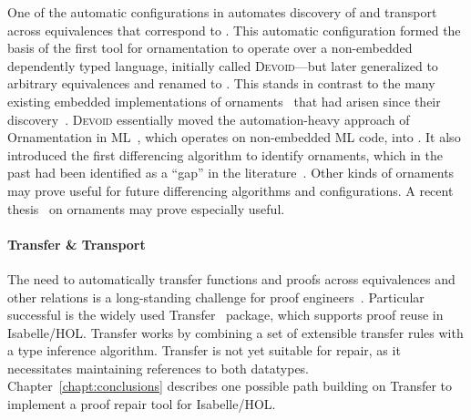 One of the automatic configurations in \toolnamec automates discovery of and transport across equivalences
that correspond to .
This automatic configuration formed the basis of the first tool for ornamentation to operate over a non-embedded dependently typed language,
initially called \textsc{Devoid}---but later generalized to arbitrary equivalences and renamed to \toolnamec.
This stands in contrast to the many existing embedded implementations of 
ornaments~\cite{Dagand:2013:CTO:2591370.2591396, ko2013relational, dagand2014transporting, ko2016programming, dagand2017essence}
that had arisen since their discovery~\cite{mcbride}.
\textsc{Devoid} essentially moved the automation-heavy approach of Ornamentation in ML~\cite{Williams2017},
which operates on non-embedded ML code, into .
It also introduced the first differencing algorithm to identify ornaments, which in the past 
had been identified as a ``gap'' in the literature~\cite{ko2016programming}.
Other kinds of ornaments may prove useful for future \toolnamec differencing algorithms and configurations.
A recent thesis~\cite{williamsphd} on ornaments may prove especially useful.

\paragraph{Transfer \& Transport}
The need to automatically transfer functions and proofs across equivalences and other relations is a long-standing challenge for proof 
engineers~\cite{magaud2000changing, Barthe2001, magaud2003changing}.
Particular successful is the widely used Transfer~\cite{Huffman2013} package, which supports proof reuse in Isabelle/HOL. %
Transfer works by combining a set of extensible transfer rules with a type inference algorithm.
Transfer is not yet suitable for repair, as it necessitates maintaining references to both datatypes.
Chapter~\ref{chapt:conclusions} describes one possible path building on Transfer to implement a proof repair tool for Isabelle/HOL.

